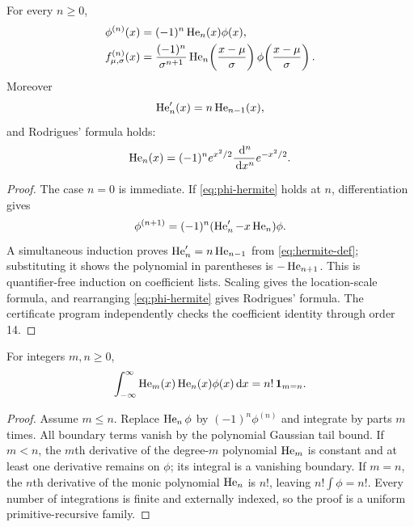 \begin{theorem}\label{thm:hermite-derivatives}
For every $n\ge0$,
\begin{align}
 \phi^{(n)}(x)&=(-1)^n\operatorname{He}_n(x)\phi(x),\label{eq:phi-hermite}\\
 f_{\mu,\sigma}^{(n)}(x)&=\frac{(-1)^n}{\sigma^{n+1}}
   \operatorname{He}_n\!\left(\frac{x-\mu}{\sigma}\right)
   \phi\!\left(\frac{x-\mu}{\sigma}\right).
\end{align}
Moreover
\begin{equation}\label{eq:hermite-derivative}
 \operatorname{He}_n'(x)=n\operatorname{He}_{n-1}(x),
\end{equation}
and Rodrigues' formula holds:
\begin{equation}\label{eq:rodrigues}
 \operatorname{He}_n(x)=(-1)^ne^{x^2/2}\frac{\,\mathrm d^n}{\,\mathrm d x^n}e^{-x^2/2}.
\end{equation}
\end{theorem}

\begin{proof}
The case $n=0$ is immediate.  If \eqref{eq:phi-hermite} holds at $n$, differentiation gives
\[
 \phi^{(n+1)}=(-1)^n(\operatorname{He}_n'-x\operatorname{He}_n)\phi.
\]
A simultaneous induction proves $\operatorname{He}_n'=n\operatorname{He}_{n-1}$ from \eqref{eq:hermite-def}; substituting it shows the polynomial in parentheses is $-\operatorname{He}_{n+1}$.  This is quantifier-free induction on coefficient lists.  Scaling gives the location-scale formula, and rearranging \eqref{eq:phi-hermite} gives Rodrigues' formula.  The certificate program independently checks the coefficient identity through order 14.
\end{proof}

\begin{corollary}\label{cor:hermite-orthogonality}
For integers $m,n\ge0$,
\begin{equation}\label{eq:hermite-orthogonality}
 \int_{-\infty}^{\infty}\operatorname{He}_m(x)\operatorname{He}_n(x)\phi(x)\,\mathrm d x
 =n!\,\mathbf 1_{m=n}.
\end{equation}
\end{corollary}

\begin{proof}
Assume $m\le n$.  Replace $\operatorname{He}_n\phi$ by $(-1)^n\phi^{(n)}$ and integrate by parts $m$ times.  All boundary terms vanish by the polynomial Gaussian tail bound.  If $m<n$, the $m$th derivative of the degree-$m$ polynomial $\operatorname{He}_m$ is constant and at least one derivative remains on $\phi$; its integral is a vanishing boundary.  If $m=n$, the $n$th derivative of the monic polynomial $\operatorname{He}_n$ is $n!$, leaving $n!\int\phi=n!$.  Every number of integrations is finite and externally indexed, so the proof is a uniform primitive-recursive family.
\end{proof}

